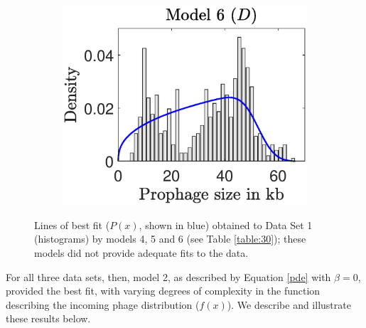 \begin{figure}[H]
 \quad
 \begin{subfigure}[t]{0.3\textwidth}
  \centering
 \includegraphics[scale=0.40]{onlyDeg.eps}
 \label{fig:Deg}
 \end{subfigure}
  \caption[Lines of best fit obtained to Data Set 1 by models 4, 5 and 6.]{ Lines of best fit ($P(x)$, shown in blue) obtained to Data Set 1 (histograms) by models 4, 5 and 6 (see Table \ref{table:30}); these models did not provide adequate fits to the data.}
\label{fig:noBi}
\end{figure}

 For all three data sets, then, model 2, as described by Equation \ref{pde} with $\beta =0$, provided the best fit, with varying degrees of complexity in the function describing the incoming phage distribution ($f(x)$).  We describe and illustrate these results below.

